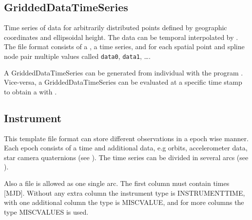 \subsection{GriddedDataTimeSeries}\label{general.fileFormat:griddedDataTimeSeries}
Time series of data for arbitrarily distributed points defined by geographic coordinates and ellipsoidal
height. The data can be temporal interpolated by .
The file format consists of a , a time series, and
for each spatial point and spline node pair multiple values called \verb|data0|, \verb|data1|, \ldots.

A GriddedDataTimeSeries can be generated from individual  with the program
. Vice-versa, a GriddedDataTimeSeries can be evaluated at a
specific time stamp to obtain a  with .


\subsection{Instrument}\label{general.fileFormat:instrument}
This template file format can store different observations in a epoch wise manner. Each epoch consists of a time and
additional data, e.g orbits, accelerometer data, star camera quaternions (see ).
The time series can be divided in several arcs (see ).

Also a  file is allowed as one single arc. The first column must contain times [MJD]. Without any extra column
the instrument type is INSTRUMENTTIME, with one additional column the type is MISCVALUE, and for more columns the type
MISCVALUES is used.

